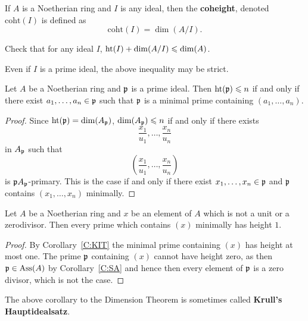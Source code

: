 \documentclass{ximera}
\begin{document}
\begin{definition} If $A$ is a Noetherian ring and $I$ is any ideal, then the \textbf{coheight}, denoted $\mathrm{coht}(I)$ is defined as 
\[
\mathrm{coht}(I) = \dim(A/I).
\]
\end{definition}

\begin{exercise} Check that for any ideal $I$, $\operatorname{ht}(I)+\dim(A/I)\leqslant\dim(A)$. 
\end{exercise}

\begin{warning}
Even if $I$ is a prime ideal, the above inequality may be strict.
\end{warning}

\begin{corollary}\label{C:KIT} Let $A$ be a Noetherian ring and $\mathfrak{p}$ is a prime ideal.  Then $\operatorname{ht}(\mathfrak{p})\leqslant n$ if and only if there exist $a_1,\dots,a_n\in\mathfrak{p}$ such that $\mathfrak{p}$ is a minimal prime containing $(a_1,\dots,a_n)$.
\end{corollary}

\begin{proof} Since $\operatorname{ht}(\mathfrak{p}) = \dim(A_{\mathfrak{p}})$, $\dim(A_{\mathfrak{p}})\leqslant n$ if and only if there exists 
\[
\frac{x_1}{u_1}, \dots, \frac{x_n}{u_n}
\]
in $A_{\mathfrak{p}}$ such that 
\[
\left(\frac{x_1}{u_1}, \dots, \frac{x_n}{u_n}\right)
\]
is $\mathfrak{p} A_{\mathfrak{p}}$-primary. This is the case if and only if there exist $x_1,\dots, x_n\in \mathfrak{p}$ and $\mathfrak{p}$ contains $(x_1,\dots,x_n)$ minimally. 
\end{proof}


\begin{corollary} Let $A$ be a Noetherian ring and $x$ be an element of $A$ which is not a unit or a zerodivisor. Then every prime which contains $(x)$ minimally has height $1$.
\end{corollary}

\begin{proof} By Corollary~\ref{C:KIT} the minimal prime containing $(x)$ has height at most one. The prime $\mathfrak{p}$ containing $(x)$ cannot have height zero, as then $\mathfrak{p}\in\operatorname{Ass}(A)$ by Corollary~\ref{C:SA} and hence then every element of $\mathfrak{p}$ is a zero divisor, which is not the case.
\end{proof}

\begin{remark} The above corollary to the Dimension Theorem is sometimes called \textbf{Krull's Hauptidealsatz}.
\end{remark}
\end{document}
